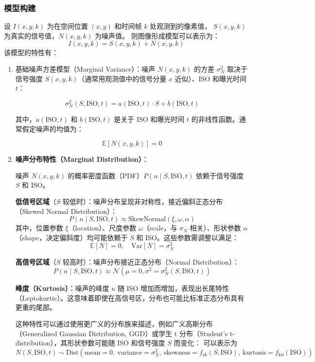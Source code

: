 \documentclass[a4paper]{article}
\begin{document}
    \subsubsection{模型构建}
	设 \( I(x, y, k) \) 为在空间位置 \((x, y)\) 和时间帧 \(k\) 处观测到的像素值，  
		\( S(x, y, k) \) 为真实的信号值，\( N(x, y, k) \) 为噪声值。  
		则图像形成模型可以表示为：
		\[
		I(x, y, k) = S(x, y, k) + N(x, y, k)
		\]
		该模型的特性有：
		\begin{enumerate}
			\item 基础噪声方差模型（Marginal Variance）：噪声 \( N(x, y, k) \) 的方差 \(\sigma_N^2\) 取决于信号强度 \( S(x, y, k) \)（通常用观测值中的信号分量 \( x \) 近似）、ISO 和曝光时间 \( t \)：

			\[
			\sigma_N^2(S, \mathrm{ISO}, t) = a(\mathrm{ISO}, t) \cdot S + b(\mathrm{ISO}, t)
			\]

			其中，\( a(\mathrm{ISO}, t) \) 和 \( b(\mathrm{ISO}, t) \) 是关于 ISO 和曝光时间 \( t \) 的非线性函数。通常假定噪声的均值为：

			\[
			\mathbb{E}[N(x, y, k)] = 0
			\]
			
            \item\textbf{噪声分布特性（Marginal Distribution）}：

				噪声 \( N(x, y, k) \) 的概率密度函数（PDF）\( P(n \mid S, \mathrm{ISO}, t) \) 依赖于信号强度 \( S \) 和 ISO。

				
				 \textbf{低信号区域}（\( S \) 较低时）：噪声分布呈现非对称性，接近偏斜正态分布（Skewed Normal Distribution）：
				\[
				P(n \mid S, \mathrm{ISO}, t) \approx \text{SkewNormal}(\xi, \omega, \alpha)
				\]
				其中，位置参数 \( \xi \)（location）、尺度参数 \( \omega \)（scale，与 \( \sigma_N \) 相关）、形状参数 \( \alpha \)（shape，决定偏斜度）均可能依赖于 \( S \) 和 ISO。这些参数需调整以满足：
				\[
				\mathbb{E}[N] = 0,\quad \mathrm{Var}[N] = \sigma_N^2
				\]

				\textbf{高信号区域}（\( S \) 较高时）：噪声分布接近正态分布（Normal Distribution）：
				\[
				P(n \mid S, \mathrm{ISO}, t) \approx \mathcal{N}(\mu = 0, \sigma^2 = \sigma_N^2(S, \mathrm{ISO}, t))
				\]

				 \textbf{峰度（Kurtosis）}：噪声的峰度 \( \kappa \) 随 ISO 增加而增加，表现出长尾特性（Leptokurtic）。这意味着即使在高信号区，分布也可能比标准正态分布具有更重的尾部。

				这种特性可以通过使用更广义的分布族来描述，例如广义高斯分布（Generalized Gaussian Distribution, GGD）或学生 t 分布（Student's t-distribution），其形状参数可能随 ISO 和信号强度 \( S \) 而变化：
                可以表示为
				\[
				N(S, \mathrm{ISO}, t) \sim \text{Dist}(\text{mean}=0,\ \text{variance}=\sigma_N^2,\ \text{skewness}=f_{\mathrm{sk}}(S, \mathrm{ISO}),\ \text{kurtosis}=f_{\mathrm{ku}}(\mathrm{ISO}))
				\]
				

\end{enumerate}
\end{document}
